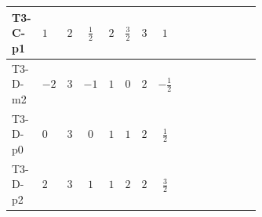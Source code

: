 \documentclass[8pt]{article}
\begin{document}
\begin{landscape}
\begin{longtable}{@{}llcccccc >{\raggedright\arraybackslash}p{0.21\linewidth} >{\raggedright\arraybackslash}p{0.21\linewidth} >{\raggedright\arraybackslash}p{0.21\linewidth}@{}}
\midrule
T3-C-p1 & $1$ & $2$ & $\frac{1}{2}$ & $2$ & $\frac{3}{2}$ & $3$ & $1$ & \scriptsize\adjustbox{max width=\linewidth}{$\begin{gathered} +2 {\lambda_1} {\lambda_{HS_1}^{(A)}}\end{gathered}$} & \scriptsize\adjustbox{max width=\linewidth}{$\begin{gathered} +8 {\lambda_{HS_1}^{(1)}} {\lambda_{HS_1}^{(A)}}\end{gathered}$} & \scriptsize\adjustbox{max width=\linewidth}{$\begin{gathered} +2 {\lambda_{HS_1}^{(A)}} {\lambda_{S_1}^{(1)}}\end{gathered}$} \\
\midrule
T3-D-m2 & $-2$ & $3$ & $-1$ & $1$ & $0$ & $2$ & $-\frac{1}{2}$ & \scriptsize\adjustbox{max width=\linewidth}{$\begin{gathered} +2 {\lambda_1} {\lambda_{HS_1}^{(A)}}\end{gathered}$} & \scriptsize\adjustbox{max width=\linewidth}{$\begin{gathered} +8 {\lambda_{HS_1}^{(1)}} {\lambda_{HS_1}^{(A)}}\end{gathered}$} & \scriptsize\adjustbox{max width=\linewidth}{$\begin{gathered} +2 {\lambda_{HS_1}^{(A)}} {\lambda_{S_1}^{(1)}}\end{gathered}$} \\
\midrule
T3-D-p0 & $0$ & $3$ & $0$ & $1$ & $1$ & $2$ & $\frac{1}{2}$ & \scriptsize\adjustbox{max width=\linewidth}{$\begin{gathered} +2 {\lambda_1} {\lambda_{HS_1}^{(A)}}\end{gathered}$} & \scriptsize\adjustbox{max width=\linewidth}{$\begin{gathered} +8 {\lambda_{HS_1}^{(1)}} {\lambda_{HS_1}^{(A)}}\end{gathered}$} & \scriptsize\adjustbox{max width=\linewidth}{$\begin{gathered} +2 {\lambda_{HS_1}^{(A)}} {\lambda_{S_1}^{(1)}}\end{gathered}$} \\
\midrule
T3-D-p2 & $2$ & $3$ & $1$ & $1$ & $2$ & $2$ & $\frac{3}{2}$ & \scriptsize\adjustbox{max width=\linewidth}{$\begin{gathered} +2 {\lambda_1} {\lambda_{HS_1}^{(A)}}\end{gathered}$} & \scriptsize\adjustbox{max width=\linewidth}{$\begin{gathered} +8 {\lambda_{HS_1}^{(1)}} {\lambda_{HS_1}^{(A)}}\end{gathered}$} & \scriptsize\adjustbox{max width=\linewidth}{$\begin{gathered} +2 {\lambda_{HS_1}^{(A)}} {\lambda_{S_1}^{(1)}}\end{gathered}$} \\

\end{longtable}
\end{landscape}
\end{document}
